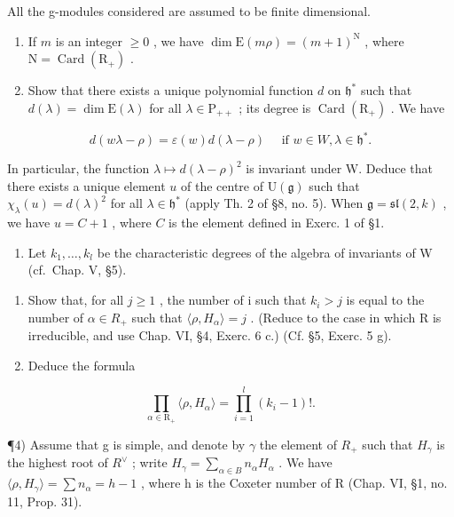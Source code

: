 
All the g-modules considered are assumed to be finite dimensional.

\begin{enumerate}
\def\labelenumi{\arabic{enumi})}
\item
  If \(m\) is an integer \(\geq 0\) , we have \(\dim \mathrm{E}(m\rho) = (m + 1)^{\mathrm{N}}\) , where \(\mathrm{N} = \operatorname{Card}(\mathrm{R}_{+})\) .
\item
  Show that there exists a unique polynomial function \(d\) on \(\mathfrak{h}^*\) such that \(d(\lambda) = \dim \mathrm{E}(\lambda)\) for all \(\lambda \in \mathrm{P}_{++}\) ; its degree is \(\operatorname{Card}(\mathrm{R}_+)\) . We have
\end{enumerate}

\[
d (w \lambda - \rho) = \varepsilon (w) d (\lambda - \rho) \quad \text { if } w \in W, \lambda \in \mathfrak {h} ^ {*}.
\]

In particular, the function \(\lambda \mapsto d(\lambda - \rho)^2\) is invariant under W. Deduce that there exists a unique element \(u\) of the centre of \(\mathrm{U}(\mathfrak{g})\) such that \(\chi_{\lambda}(u) = d(\lambda)^2\) for all \(\lambda \in \mathfrak{h}^*\) (apply Th. 2 of §8, no. 5). When \(\mathfrak{g} = \mathfrak{sl}(2,k)\) , we have \(u = C + 1\) , where \(C\) is the element defined in Exerc. 1 of §1.

\begin{enumerate}
\def\labelenumi{\arabic{enumi})}
\setcounter{enumi}{2}
\tightlist
\item
  Let \(k_{1}, \ldots, k_{l}\) be the characteristic degrees of the algebra of invariants of W (cf.~Chap. V, §5).
\end{enumerate}

\begin{enumerate}
\def\labelenumi{\alph{enumi})}
\item
  Show that, for all \(j \geq 1\) , the number of i such that \(k_{i} > j\) is equal to the number of \(\alpha \in R_{+}\) such that \(\langle \rho, H_{\alpha} \rangle = j\) . (Reduce to the case in which R is irreducible, and use Chap. VI, §4, Exerc. 6 c.) (Cf. §5, Exerc. 5 g).
\item
  Deduce the formula
\end{enumerate}

\[
\prod_ {\alpha \in \mathrm{R} _ {+}} \langle \rho , H _ {\alpha} \rangle = \prod_ {i = 1} ^ {l} (k _ {i} - 1)!.
\]

¶4) Assume that g is simple, and denote by \(\gamma\) the element of \(R_{+}\) such that \(H_{\gamma}\) is the highest root of \(R^{\vee}\) ; write \(H_{\gamma} = \sum_{\alpha \in B} n_{\alpha} H_{\alpha}\) . We have \(\langle \rho, H_{\gamma} \rangle = \sum n_{\alpha} = h - 1\) , where h is the Coxeter number of R (Chap. VI, §1, no. 11, Prop. 31).

